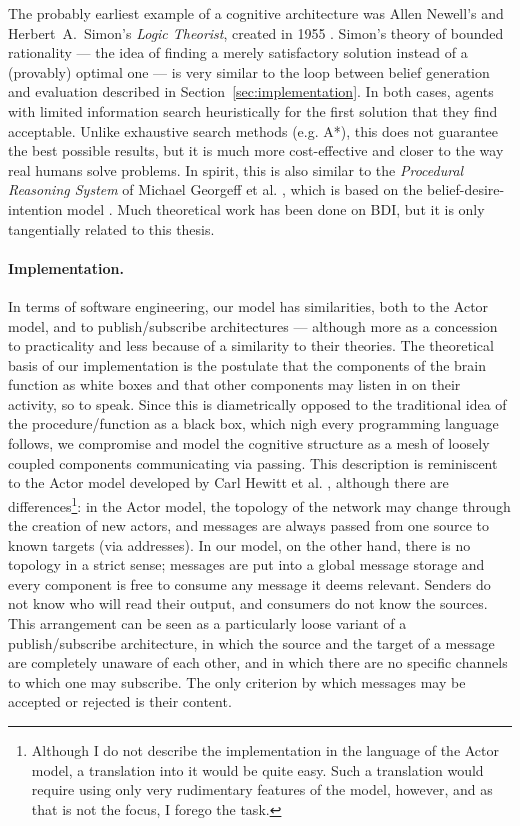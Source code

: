 The probably earliest example of a cognitive architecture was Allen Newell's and Herbert~A.~Simon's {\em Logic Theorist}, created in 1955 \cite[p. 44]{crevier93}. Simon's theory of bounded rationality \cite{Gigerenzer2001} --- the idea of finding a merely satisfactory solution instead of a (provably) optimal one --- is very similar to the loop between belief generation and evaluation described in Section~\ref{sec:implementation}. In both cases, agents with limited information search heuristically for the first solution that they find acceptable. Unlike exhaustive search methods (e.g. A*), this does not guarantee the best possible results, but it is much more cost-effective and closer to the way real humans solve problems. In spirit, this is also similar to the {\em Procedural Reasoning System} of Michael Georgeff et al. \cite{pcs}, which is based on the belief-desire-intention model \cite{Rao95bdiagents, Bratman87}. Much theoretical work has been done on BDI, but it is only tangentially related to this thesis.

\paragraph{Implementation.} In terms of software engineering, our model has similarities, both to the Actor model, and to publish/subscribe architectures \cite{publishSubscribe} --- although more as a concession to practicality and less because of a similarity to their theories. The theoretical basis of our implementation is the postulate that the components of the brain function as white boxes and that other components may listen in on their activity, so to speak. Since this is diametrically opposed to the traditional idea of the procedure/function as a black box, which nigh every programming language follows, we compromise and model the cognitive structure as a mesh of loosely coupled components communicating via passing. This description is reminiscent to the Actor model developed by Carl Hewitt et al. \cite{hewittActor}, although there are differences\footnote{Although I do not describe the implementation in the language of the Actor model, a translation into it would be quite easy. Such a translation would require using only very rudimentary features of the model, however, and as that is not the focus, I forego the task.}: in the Actor model, the topology of the network may change through the creation of new actors, and messages are always passed from one source to known targets (via addresses). In our model, on the other hand, there is no topology in a strict sense; messages are put into a global message storage and every component is free to consume any message it deems relevant. Senders do not know who will read their output, and consumers do not know the sources. This arrangement can be seen as a particularly loose variant of a publish/subscribe architecture, in which the source and the target of a message are completely unaware of each other, and in which there are no specific channels to which one may subscribe. The only criterion by which messages may be accepted or rejected is their content.

